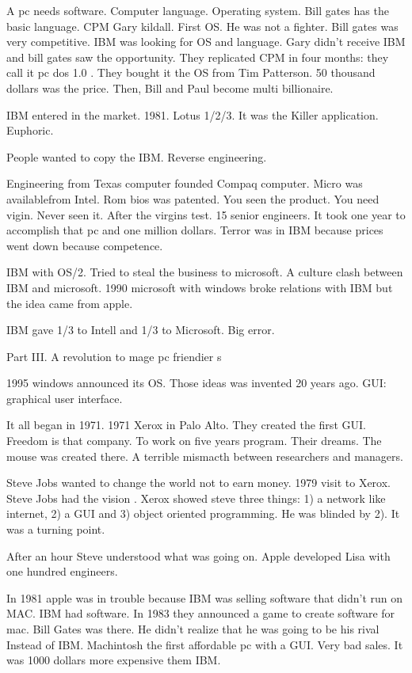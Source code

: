   A pc needs software. Computer language. Operating system. Bill gates has the basic language. CPM Gary kildall. First OS. He was not a 
  fighter. Bill gates was very competitive. 
  IBM was looking for OS and language. Gary didn't receive IBM and bill gates saw the opportunity. They replicated CPM in four months: they 
  call it pc dos 1.0 . They bought it the OS from Tim Patterson. 50 thousand dollars was the price. Then, Bill and Paul become multi 
  billionaire.
  
  IBM entered in the market. 1981. Lotus 1/2/3.
  It was the Killer application. Euphoric. 
  
  People wanted to copy the IBM. 
  Reverse engineering. 
  
  Engineering from Texas computer founded Compaq computer. Micro was availablefrom Intel. Rom bios was patented. You seen the product. You 
  need vigin. Never seen it. After the virgins test. 15 senior engineers. It took one year to accomplish that pc and one million dollars. 
  Terror was in IBM because prices went down because competence. 
  
  IBM with OS/2. Tried to steal the business to microsoft. A culture clash between IBM and microsoft. 1990 microsoft with windows broke 
  relations with IBM but the idea came from apple. 
  
  IBM gave 1/3 to Intell and 1/3 to Microsoft. Big error. 
  
  Part III.
  A revolution to mage pc friendier s
  
  1995 windows announced its OS. Those ideas was invented 20 years ago.  GUI: graphical user interface. 
  
  It all began in 1971. 
  1971 Xerox in Palo Alto. They created the first GUI. Freedom is that company. To work on five years program. Their dreams. The mouse was 
  created there. A terrible mismacth between researchers and managers. 
  
  Steve Jobs wanted to change the world not to earn money. 1979 visit to Xerox. 
  Steve Jobs had the vision . Xerox showed steve three things: 1) a network like internet, 2) a GUI and  3) object oriented programming. He 
  was blinded by 2). It was a turning point. 
  
  After an hour Steve understood what was going on. Apple developed Lisa with one hundred engineers. 
  
  In 1981 apple was in trouble because IBM was selling software that didn't run on MAC. IBM had software. In 1983 they announced a game to 
  create software for mac. Bill Gates was there. He didn't realize that he was going to be his rival Instead of IBM. Machintosh the first 
  affordable pc with a GUI. Very bad sales. It was 1000 dollars more expensive them IBM. 
  
